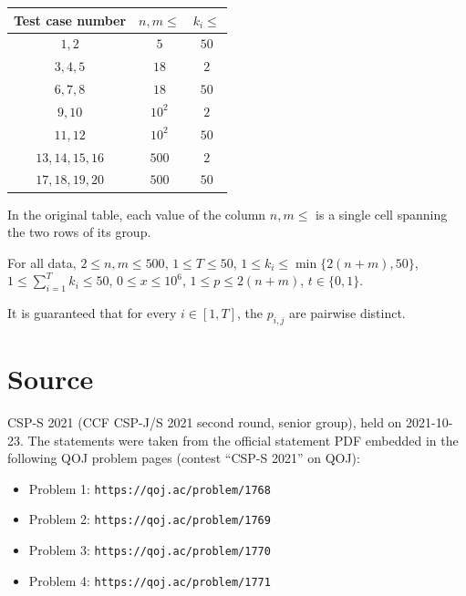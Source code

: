 \documentclass[11pt]{article}
\begin{document}
\begin{center}
\begin{tabular}{ccc}
\toprule
Test case number & $n, m \le$ & $k_i \le$ \\
\midrule
$1, 2$ & $5$ & $50$ \\
\midrule
$3, 4, 5$ & $18$ & $2$ \\
$6, 7, 8$ & $18$ & $50$ \\
\midrule
$9, 10$ & $10^2$ & $2$ \\
$11, 12$ & $10^2$ & $50$ \\
\midrule
$13, 14, 15, 16$ & $500$ & $2$ \\
$17, 18, 19, 20$ & $500$ & $50$ \\
\bottomrule
\end{tabular}
\end{center}

In the original table, each value of the column $n, m \le$ is a single
cell spanning the two rows of its group.

For all data, $2 \le n, m \le 500$, $1 \le T \le 50$,
$1 \le k_i \le \min\{2(n + m), 50\}$, $1 \le \sum_{i=1}^{T} k_i \le 50$,
$0 \le x \le 10^6$, $1 \le p \le 2(n + m)$, $t \in \{0, 1\}$.

It is guaranteed that for every $i \in [1, T]$, the $p_{i,j}$ are pairwise
distinct.

\section*{Source}

CSP-S 2021 (CCF CSP-J/S 2021 second round, senior group), held on
2021-10-23.
The statements were taken from the official statement PDF embedded in the
following QOJ problem pages (contest ``CSP-S 2021'' on QOJ):
\begin{itemize}
\item Problem 1: \texttt{https://qoj.ac/problem/1768}
\item Problem 2: \texttt{https://qoj.ac/problem/1769}
\item Problem 3: \texttt{https://qoj.ac/problem/1770}
\item Problem 4: \texttt{https://qoj.ac/problem/1771}
\end{itemize}
\end{document}
